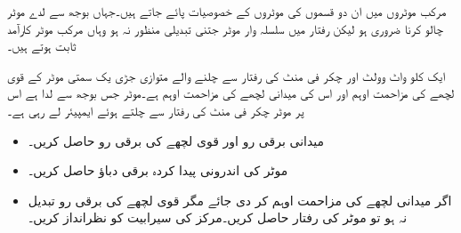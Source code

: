 مرکب موٹروں میں ان دو قسموں کی موٹروں کے خصوصیات پائے جاتے ہیں۔جہاں بوجھ سے لدے موٹر چالو کرنا ضروری ہو لیکن رفتار میں سلسلہ وار موٹر جتنی تبدیلی منظور نہ ہو وہاں مرکب موٹر کارآمد ثابت ہوتے ہیں۔

ایک   کلو واٹ  وولٹ اور  چکر فی منٹ کی رفتار سے چلنے والے متوازی جڑی یک سمتی موٹر کے قوی لچھے کی مزاحمت  اوہم اور اس کی میدانی لچھے کی مزاحمت   اوہم ہے۔موٹر جس بوجھ سے لدا ہے اس پر موٹر   چکر فی منٹ کی رفتار سے چلتے ہوئے   ایمپیئر لے رہی ہے۔ 
\begin{itemize}
\item
میدانی برقی رو اور قوی لچھے کی برقی رو حاصل کریں۔
\item
موٹر کی اندرونی پیدا کردہ برقی دباؤ حاصل کریں۔
\item
اگر میدانی لچھے کی مزاحمت  اوہم کر دی جائے  مگر قوی لچھے کی برقی رو تبدیل نہ ہو  تو موٹر کی رفتار حاصل کریں۔مرکز کی سیرابیت کو نظرانداز کریں۔
\end{itemize}

